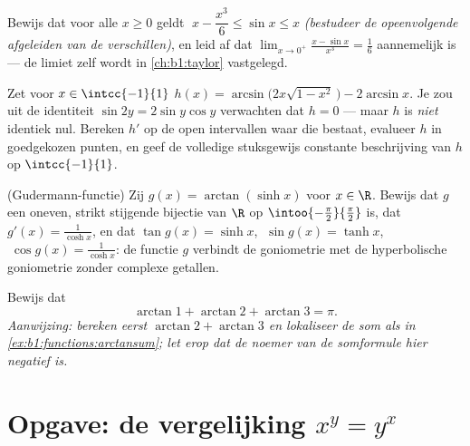 \begin{exercise}[$\star\star$]\label{exo:b1:functions:9}
Bewijs dat voor alle $x \geq 0$ geldt $\;x - \dfrac{x^3}{6} \leq \sin x
\leq x$ \emph{(bestudeer de opeenvolgende afgeleiden van de
verschillen)}, en leid af dat $\lim_{x \to 0^+} \frac{x - \sin x}{x^3} =
\frac 16$ aannemelijk is --- de limiet zelf wordt in
\cref{ch:b1:taylor} vastgelegd.
\end{exercise}

\begin{exercise}[$\star\star\star$]\label{exo:b1:functions:10}
Zet voor $x \in \intcc{-1}{1}$
$h(x) = \arcsin\bigl(2x\sqrt{1 - x^2}\,\bigr) - 2\arcsin x$. Je zou uit
de identiteit $\sin 2y = 2\sin y\cos y$ verwachten dat $h = 0$ --- maar
$h$ is \emph{niet} identiek nul. Bereken $h'$ op de open intervallen
waar die bestaat, evalueer $h$ in goedgekozen punten, en geef de
volledige stuksgewijs constante beschrijving van $h$ op $\intcc{-1}{1}$.
\end{exercise}

\begin{exercise}[$\star\star\star$]\label{exo:b1:functions:11}
(Gudermann-functie) Zij $g(x) = \arctan(\sinh x)$ voor $x \in \R$.
Bewijs dat $g$ een oneven, strikt stijgende bijectie van $\R$ op
$\intoo{-\frac\pi2}{\frac\pi2}$ is, dat $g'(x) = \frac{1}{\cosh x}$, en
dat $\tan g(x) = \sinh x$, $\;\sin g(x) = \tanh x$, $\;\cos g(x) =
\frac{1}{\cosh x}$: de functie $g$ verbindt de goniometrie met de
hyperbolische goniometrie zonder complexe getallen.
\end{exercise}

\begin{exercise}[$\star\star$]\label{exo:b1:functions:12}
Bewijs dat
\[
\arctan 1 + \arctan 2 + \arctan 3 = \pi .
\]
\emph{Aanwijzing: bereken eerst $\arctan 2 + \arctan 3$ en lokaliseer de
som als in \cref{ex:b1:functions:arctansum}; let erop dat de noemer van
de somformule hier negatief is.}
\end{exercise}

\section{Opgave: de vergelijking $x^y = y^x$}

